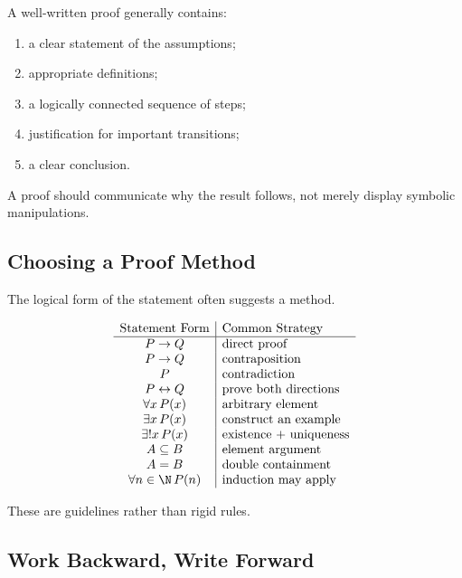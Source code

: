 A well-written proof generally contains:

\begin{enumerate}
    \item a clear statement of the assumptions;
    \item appropriate definitions;
    \item a logically connected sequence of steps;
    \item justification for important transitions;
    \item a clear conclusion.
\end{enumerate}

A proof should communicate why the result follows, not merely display symbolic
manipulations.

\subsection{Choosing a Proof Method}
\label{subsec:choosing-proof-method}

The logical form of the statement often suggests a method.

\[
\begin{array}{c|l}
\text{Statement Form} & \text{Common Strategy}\\ \hline
P\to Q & \text{direct proof}\\
P\to Q & \text{contraposition}\\
P & \text{contradiction}\\
P\leftrightarrow Q & \text{prove both directions}\\
\forall x\,P(x) & \text{arbitrary element}\\
\exists x\,P(x) & \text{construct an example}\\
\exists!x\,P(x) & \text{existence + uniqueness}\\
A\subseteq B & \text{element argument}\\
A=B & \text{double containment}\\
\forall n\in\N\,P(n) & \text{induction may apply}
\end{array}
\]

These are guidelines rather than rigid rules.

\subsection{Work Backward, Write Forward}
\label{subsec:work-backward-write-forward}

